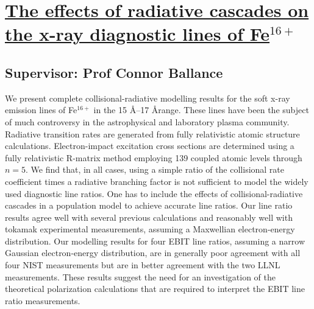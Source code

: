\section{\href{http://dx.doi.org/10.1088/0953-4075/39/1/009}{The effects of radiative cascades on the x-ray
diagnostic lines of Fe$^{16+}$}}

\subsection*{Supervisor: Prof Connor Ballance}

We present complete collisional-radiative modelling results for the soft x-ray
emission lines of Fe$^{16+}$ in the 15 \AA–17 \AA range. These lines have been
the subject of much controversy in the astrophysical and laboratory plasma
community. Radiative transition rates are generated from fully relativistic
atomic structure calculations. Electron-impact excitation cross sections are
determined using a fully relativistic R-matrix method employing 139 coupled
atomic levels through $n = 5$. We find that, in all cases, using a simple ratio of
the collisional rate coefficient times a radiative branching factor is not sufficient
to model the widely used diagnostic line ratios. One has to include the effects
of collisional-radiative cascades in a population model to achieve accurate line
ratios. Our line ratio results agree well with several previous calculations
and reasonably well with tokamak experimental measurements, assuming a
Maxwellian electron-energy distribution. Our modelling results for four EBIT
line ratios, assuming a narrow Gaussian electron-energy distribution, are in
generally poor agreement with all four NIST measurements but are in better
agreement with the two LLNL measurements. These results suggest the need
for an investigation of the theoretical polarization calculations that are required
to interpret the EBIT line ratio measurements.

